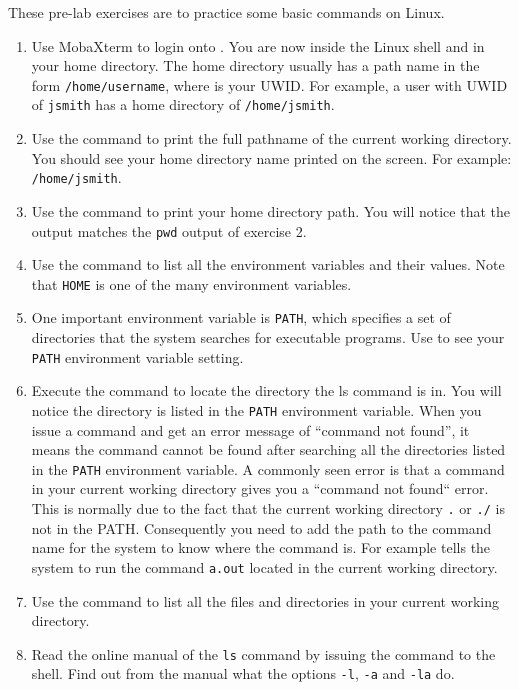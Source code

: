 These pre-lab exercises are to practice some basic commands on Linux. 
\begin{enumerate}
    \item Use MobaXterm to login onto
      . You are now inside the Linux shell and in your home directory. The home directory usually has a path name in the form \verb+/home/username+, where  is your UWID. For example, a user with UWID of \verb+jsmith+ has a home directory of \verb+/home/jsmith+.
    \item Use the  command to print the full pathname of the current working directory. You should see your home directory name printed on the screen. For example: \verb+/home/jsmith+.
    \item Use the  command to print your home directory path. You will notice that the output matches the \verb+pwd+ output of exercise 2.
    \item Use the  command to list all the environment variables and their values. Note that \verb+HOME+ is one of the many environment variables.
    \item One important environment variable is \verb+PATH+, which specifies a set of directories that the system searches for executable programs. Use  to see your \verb+PATH+ environment variable setting.
    \item Execute the command  to locate the directory the ls command is in. You will notice the directory is listed in the \verb+PATH+ environment variable. When you issue a command and get an error message of ``command not found'', it means the command cannot be found after searching all the directories listed in the \verb+PATH+ environment variable. A commonly seen error is that a command in your current working directory gives you a ``command not found`` error. This is normally due to the fact that the current working directory \verb+.+ or \verb+./+ is not in the PATH. Consequently you need to add the path to the command name for the system to know where the command is. For example  tells the system to run the command \verb+a.out+ located in the current working directory. 
    \item Use the  command to list all the files and directories in your current working directory. 
    \item Read the online manual of the \verb+ls+ command by issuing the
       command to the shell.
      Find out from the manual what the options \verb+-l+, \verb+-a+ and \verb+-la+ do.

\end{enumerate}
